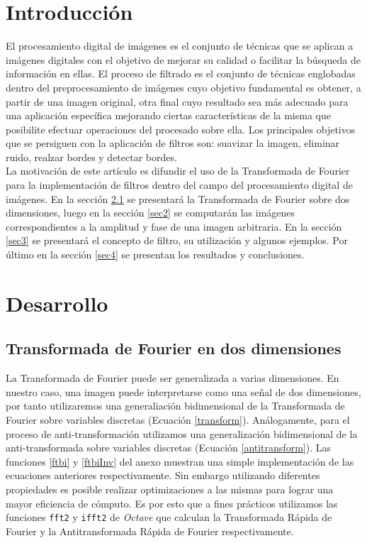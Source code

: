 \documentclass{article}
\begin{document}
\begin{multicols}{2}

\section{Introducción}

\par 
El procesamiento digital de imágenes es el conjunto de técnicas que se aplican a imágenes digitales con el objetivo de mejorar su calidad o facilitar la búsqueda de información en ellas. El proceso de filtrado es el conjunto de técnicas englobadas dentro del preprocesamiento de imágenes cuyo objetivo fundamental es obtener, a partir de una imagen original, otra final cuyo resultado sea más adecuado para una aplicación específica mejorando ciertas características de la misma que posibilite efectuar operaciones del procesado sobre ella. Los principales objetivos que se persiguen con la aplicación de filtros son: suavizar la imagen, eliminar ruido, realzar bordes y detectar bordes.\\

La motivación de este artículo es difundir el uso de la Transformada de Fourier para la implementación de filtros dentro del campo del procesamiento digital de imágenes. En la sección \ref{sec1} se presentará la Transformada de Fourier sobre dos dimensiones, luego en la sección \ref{sec2} se computarán las imágenes correspondientes a la amplitud y fase de una imagen arbitraria. En la sección \ref{sec3} se presentará el concepto de filtro, su utilización y algunos ejemplos. Por último en la sección \ref{sec4} se presentan los resultados y conclusiones.

\section{Desarrollo}
\subsection{Transformada de Fourier en dos dimensiones}
\label{sec1}

\par La Transformada de Fourier puede ser generalizada a varias dimensiones. En nuestro caso, una imagen puede interpretarse como una señal de dos dimensiones, por tanto utilizaremos una generaliación bidimensional de la Transformada de Fourier sobre variables discretas (Ecuación \ref{transform}). Análogamente, para el proceso de anti-transformación utilizamos una generalización bidimensional de la anti-transformada sobre variables discretas (Ecuación \ref{antitransform}). Las funciones  \ref{ftbi} y \ref{ftbiInv} del anexo muestran una simple implementación de las ecuaciones anteriores respectivamente. Sin embargo utilizando diferentes propiedades es posible realizar optimizaciones a las mismas para lograr una mayor eficiencia de cómputo. Es por esto que a fines prácticos utilizamos las funciones \verb+fft2+ y \verb+ifft2+ de \textit{Octave} que calculan la Transformada Rápida de Fourier y la Antitransformada Rápida de Fourier respectivamente.


\end{multicols}
\end{document}
